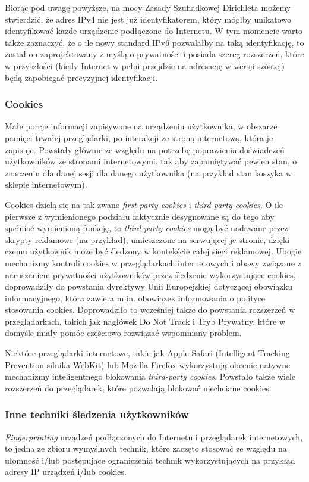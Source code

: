 Biorąc pod uwagę powyższe, na mocy Zasady Szufladkowej Dirichleta możemy
stwierdzić, że adres IPv4 nie jest już identyfikatorem, który mógłby unikatowo
identyfikować każde urządzenie podłączone do Internetu. W tym momencie warto
także zaznaczyć, że o ile nowy standard IPv6 pozwalałby na taką identyfikację,
to został on zaprojektowany z myślą o prywatności i posiada szereg rozszerzeń,
które w przyszłości (kiedy Internet w pełni przejdzie na adresację w wersji
szóstej) będą zapobiegać precyzyjnej identyfikacji.

\subsubsection{Cookies}
Małe porcje informacji zapisywane na urządzeniu użytkownika, w obszarze pamięci
trwałej przeglądarki, po interakcji ze stroną internetową, która je zapisuje.
Powstały głównie ze względu na potrzebę poprawienia doświadczeń użytkowników ze
stronami internetowymi, tak aby zapamiętywać pewien stan, o znaczeniu dla danej
sesji dla danego użytkownika (na przykład stan koszyka w sklepie internetowym).

Cookies dzielą się na tak zwane \emph{first-party cookies} i \emph{third-party
cookies}. O ile pierwsze z wymienionego podziału faktycznie desygnowane są do
tego aby spełniać wymienioną funkcję, to \emph{third-party cookies} mogą być
nadawane przez skrypty reklamowe (na przykład), umieszczone na serwującej je
stronie, dzięki czemu użytkownik może być śledzony w kontekście całej sieci
reklamowej. Ubogie mechanizmy kontroli cookies w przeglądarkach internetowych i
obawy związane z naruszaniem prywatności użytkowników przez śledzenie
wykorzystujące cookies, doprowadziły do powstania dyrektywy Unii Europejskiej
dotyczącej obowiązku informacyjnego, która zawiera m.in. obowiązek informowania
o polityce stosowania cookies. Doprowadziło to wcześniej także do powstania
rozszerzeń w przeglądarkach, takich jak nagłówek Do Not Track i Tryb Prywatny,
które w domyśle miały pomóc częściowo rozwiązać wspomniany problem.

Niektóre przeglądarki internetowe, takie jak Apple Safari (Intelligent Tracking
Prevention silnika WebKit) lub Mozilla Firefox wykorzystują obecnie natywne
mechanizmy inteligentnego blokowania \emph{third-party cookies}. Powstało także
wiele rozszerzeń do przeglądarek, które pozwalają blokować niechciane cookies.

\subsubsection{Inne techniki śledzenia użytkowników}
\emph{Fingerprinting} urządzeń podłączonych do Internetu i przeglądarek
internetowych, to jedna ze zbioru wymyślnych technik, które zaczęto stosować ze
względu na ułomność i/lub postępujące ograniczenia technik wykorzystujących na
przykład adresy IP urządzeń i/lub cookies.


